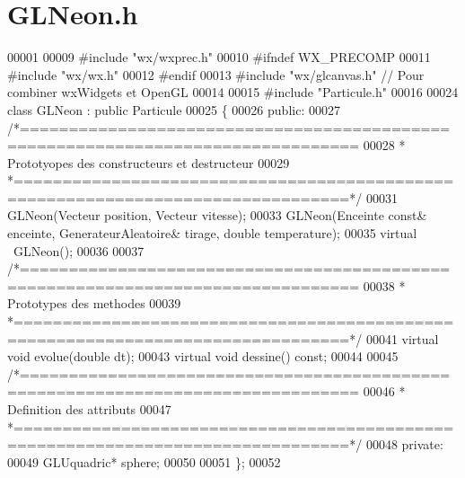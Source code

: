 \section{G\+L\+Neon.\+h}
\label{_g_l_neon_8h_source}

\begin{DoxyCode}
00001 
00009 \textcolor{preprocessor}{#include "wx/wxprec.h"}
00010 \textcolor{preprocessor}{#ifndef WX\_PRECOMP}
00011 \textcolor{preprocessor}{#include "wx/wx.h"}
00012 \textcolor{preprocessor}{#endif}
00013 \textcolor{preprocessor}{#include "wx/glcanvas.h"} \textcolor{comment}{// Pour combiner wxWidgets et OpenGL}
00014 
00015 \textcolor{preprocessor}{#include "Particule.h"}
00016 
00024 \textcolor{keyword}{class }GLNeon : \textcolor{keyword}{public} Particule
00025 \{
00026     \textcolor{keyword}{public}:
00027 \textcolor{comment}{/*================================================================================}
00028 \textcolor{comment}{ * Prototyopes des constructeurs et destructeur}
00029 \textcolor{comment}{ *================================================================================*/}
00031     GLNeon(Vecteur position, Vecteur vitesse);
00033     GLNeon(Enceinte \textcolor{keyword}{const}& enceinte, GenerateurAleatoire& tirage, \textcolor{keywordtype}{double} temperature);
00035     \textcolor{keyword}{virtual} ~GLNeon();
00036     
00037 \textcolor{comment}{/*================================================================================}
00038 \textcolor{comment}{ * Prototypes des methodes}
00039 \textcolor{comment}{ *================================================================================*/}
00041     \textcolor{keyword}{virtual} \textcolor{keywordtype}{void} evolue(\textcolor{keywordtype}{double} dt);
00043     \textcolor{keyword}{virtual} \textcolor{keywordtype}{void} dessine() \textcolor{keyword}{const};
00044     
00045 \textcolor{comment}{/*================================================================================}
00046 \textcolor{comment}{ * Definition des attributs}
00047 \textcolor{comment}{ *================================================================================*/}
00048     \textcolor{keyword}{private}:
00049     GLUquadric* sphere;
00050 
00051 \};
00052 
\end{DoxyCode}
